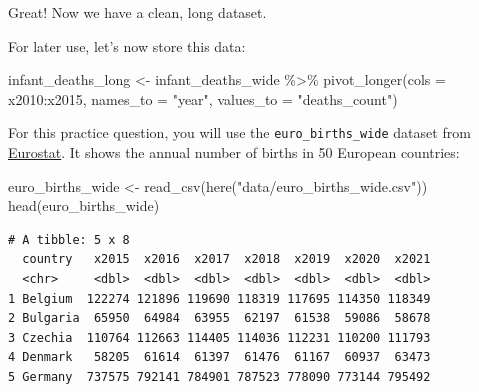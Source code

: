\documentclass[
  letterpaper,
  DIV=11,
  numbers=noendperiod]{scrreprt}
\newenvironment{Shaded}{\begin{snugshade}}{\end{snugshade}}
\newcommand{\AttributeTok}[1]{\textcolor[rgb]{0.40,0.45,0.13}{#1}}
\newcommand{\FunctionTok}[1]{\textcolor[rgb]{0.28,0.35,0.67}{#1}}
\newcommand{\NormalTok}[1]{\textcolor[rgb]{0.00,0.23,0.31}{#1}}
\newcommand{\OtherTok}[1]{\textcolor[rgb]{0.00,0.23,0.31}{#1}}
\newcommand{\SpecialCharTok}[1]{\textcolor[rgb]{0.37,0.37,0.37}{#1}}
\newcommand{\StringTok}[1]{\textcolor[rgb]{0.13,0.47,0.30}{#1}}
\begin{document}
Great! Now we have a clean, long dataset.

For later use, let's now store this data:

\begin{Shaded}
\begin{Highlighting}[]
\NormalTok{infant\_deaths\_long }\OtherTok{\textless{}{-}} 
\NormalTok{  infant\_deaths\_wide }\SpecialCharTok{\%\textgreater{}\%} 
  \FunctionTok{pivot\_longer}\NormalTok{(}\AttributeTok{cols =}\NormalTok{ x2010}\SpecialCharTok{:}\NormalTok{x2015,}
               \AttributeTok{names\_to =} \StringTok{"year"}\NormalTok{, }
               \AttributeTok{values\_to =} \StringTok{"deaths\_count"}\NormalTok{)}
\end{Highlighting}
\end{Shaded}

\begin{tcolorbox}[enhanced jigsaw, titlerule=0mm, colback=white, left=2mm, breakable, opacitybacktitle=0.6, colbacktitle=quarto-callout-tip-color!10!white, colframe=quarto-callout-tip-color-frame, bottomtitle=1mm, opacityback=0, coltitle=black, arc=.35mm, toptitle=1mm, title=\textcolor{quarto-callout-tip-color}{\faLightbulb}\hspace{0.5em}{Practice}, leftrule=.75mm, toprule=.15mm, bottomrule=.15mm, rightrule=.15mm]

For this practice question, you will use the \texttt{euro\_births\_wide}
dataset from
\href{https://ec.europa.eu/eurostat/databrowser/view/tps00204/default/table}{Eurostat}.
It shows the annual number of births in 50 European countries:

\begin{Shaded}
\begin{Highlighting}[]
\NormalTok{euro\_births\_wide }\OtherTok{\textless{}{-}} 
  \FunctionTok{read\_csv}\NormalTok{(}\FunctionTok{here}\NormalTok{(}\StringTok{"data/euro\_births\_wide.csv"}\NormalTok{))}
\FunctionTok{head}\NormalTok{(euro\_births\_wide)}
\end{Highlighting}
\end{Shaded}

\begin{verbatim}
# A tibble: 5 x 8
  country   x2015  x2016  x2017  x2018  x2019  x2020  x2021
  <chr>     <dbl>  <dbl>  <dbl>  <dbl>  <dbl>  <dbl>  <dbl>
1 Belgium  122274 121896 119690 118319 117695 114350 118349
2 Bulgaria  65950  64984  63955  62197  61538  59086  58678
3 Czechia  110764 112663 114405 114036 112231 110200 111793
4 Denmark   58205  61614  61397  61476  61167  60937  63473
5 Germany  737575 792141 784901 787523 778090 773144 795492
\end{verbatim}


\end{tcolorbox}
\end{document}
